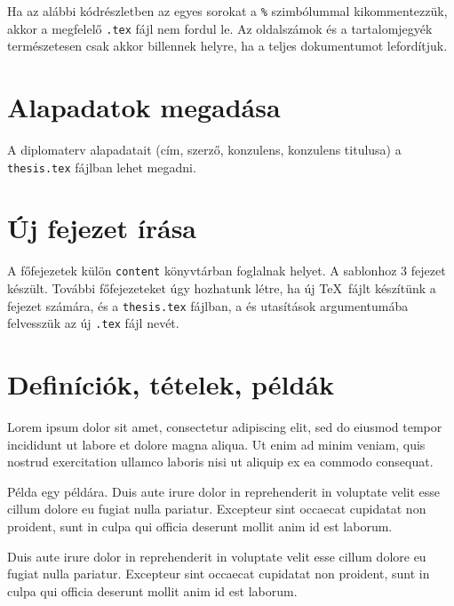 Ha az alábbi kódrészletben az egyes sorokat a \verb+%+ szimbólummal kikommentezzük, akkor a megfelelő \verb+.tex+ fájl nem fordul le. Az oldalszámok és a tartalomjegyék természetesen csak akkor billennek helyre, ha a teljes dokumentumot lefordítjuk.

\newpage
\section{Alapadatok megadása}
A diplomaterv alapadatait (cím, szerző, konzulens, konzulens titulusa) a \verb+thesis.tex+ fájlban lehet megadni.

\section{Új fejezet írása}
A főfejezetek külön \verb+content+ könyvtárban foglalnak helyet. A sablonhoz 3 fejezet készült. További főfejezeteket úgy hozhatunk létre, ha új \TeX~fájlt készítünk a fejezet számára, és a \verb+thesis.tex+ fájlban, a \verb++ és \verb++ utasítások argumentumába felvesszük az új \verb+.tex+ fájl nevét.


\section{Definíciók, tételek, példák}

\begin{definition}
Lorem ipsum dolor sit amet, consectetur adipiscing elit, sed do eiusmod tempor incididunt ut labore et dolore magna aliqua. Ut enim ad minim veniam, quis nostrud exercitation ullamco laboris nisi ut aliquip ex ea commodo consequat.
\end{definition}

\begin{example}
Példa egy példára. Duis aute irure dolor in reprehenderit in voluptate velit esse cillum dolore eu fugiat nulla pariatur. Excepteur sint occaecat cupidatat non proident, sunt in culpa qui officia deserunt mollit anim id est laborum.
\end{example}

\begin{theorem}
Duis aute irure dolor in reprehenderit in voluptate velit esse cillum dolore eu fugiat nulla pariatur. Excepteur sint occaecat cupidatat non proident, sunt in culpa qui officia deserunt mollit anim id est laborum.
\end{theorem}

